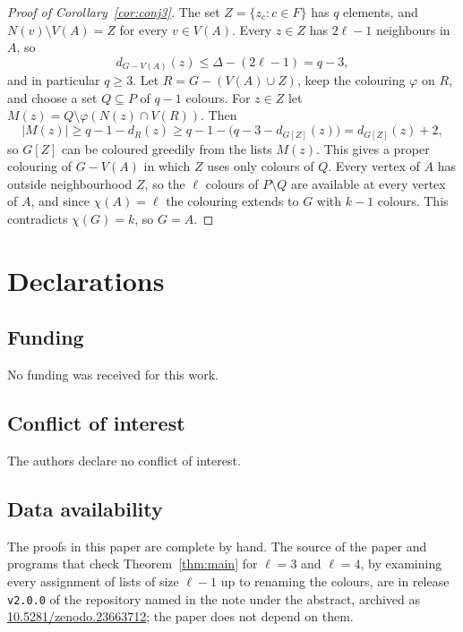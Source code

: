 \documentclass[11pt,a4paper,reqno]{amsart}
\theoremstyle{definition}
\theoremstyle{remark}
\begin{document}
\begin{proof}[Proof of Corollary~\ref{cor:conj3}]
The set $Z=\{z_c:c\in F\}$ has $q$ elements, and $N(v)\setminus V(A)=Z$ for every $v\in V(A)$. Every $z\in Z$ has $2\ell-1$ neighbours in $A$, so
\[
d_{G-V(A)}(z)\le\Delta-(2\ell-1)=q-3,
\]
and in particular $q\ge3$. Let $R=G-(V(A)\cup Z)$, keep the colouring $\varphi$ on $R$, and choose a set $Q\subseteq P$ of $q-1$ colours. For $z\in Z$ let $M(z)=Q\setminus\varphi(N(z)\cap V(R))$. Then
\[
|M(z)|\ge q-1-d_R(z)\ge q-1-\bigl(q-3-d_{G[Z]}(z)\bigr)=d_{G[Z]}(z)+2,
\]
so $G[Z]$ can be coloured greedily from the lists $M(z)$. This gives a proper colouring of $G-V(A)$ in which $Z$ uses only colours of $Q$. Every vertex of $A$ has outside neighbourhood $Z$, so the $\ell$ colours of $P\setminus Q$ are available at every vertex of $A$, and since $\chi(A)=\ell$ the colouring extends to $G$ with $k-1$ colours. This contradicts $\chi(G)=k$, so $G=A$.
\end{proof}

\section*{Declarations}

\subsection*{Funding} No funding was received for this work.

\subsection*{Conflict of interest} The authors declare no conflict of interest.

\subsection*{Data availability} The proofs in this paper are complete by hand. The source of the paper and programs that check Theorem~\ref{thm:main} for $\ell=3$ and $\ell=4$, by examining every assignment of lists of size $\ell-1$ up to renaming the colours, are in release \texttt{v2.0.0} of the repository named in the note under the abstract, archived as \href{https://doi.org/10.5281/zenodo.23663712}{10.5281/zenodo.23663712}; the paper does not depend on them.
\end{document}
